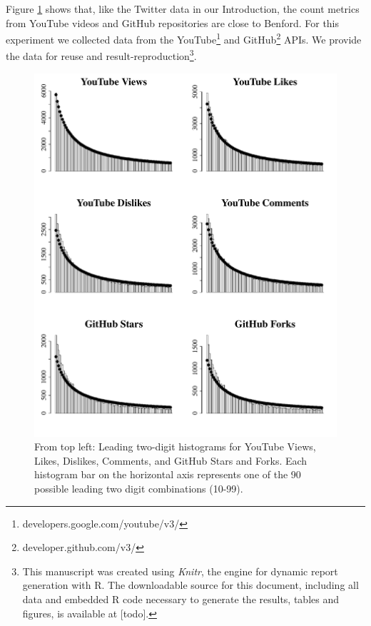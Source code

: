 \documentclass[twoside,leqno,twocolumn]{article}\usepackage[]{graphicx}\usepackage[]{color}
\makeatletter
\def\maxwidth{ %
  \ifdim\Gin@nat@width>\linewidth
    \linewidth
  \else
    \Gin@nat@width
  \fi
}
\newenvironment{knitrout}{}{} %
\makeatother
\begin{document}
Figure \ref{fig:github-data-digit-distributions} shows that, like the Twitter data in our Introduction, the count metrics from YouTube videos and GitHub repositories are close to Benford. For this experiment we collected data from the YouTube\footnote{developers.google.com/youtube/v3/} and GitHub\footnote{developer.github.com/v3/} APIs. We provide the data for reuse and result-reproduction\footnote{\label{supMatFootnote}This manuscript was created using \textit{Knitr}, the engine for dynamic report generation with R. The downloadable source for this document, including all data and embedded R code necessary to generate the results, tables and figures, is available at [todo].}. 

\begin{knitrout}
\color{fgcolor}\begin{figure}[h]
\includegraphics[width=\maxwidth]{figure/github-data-digit-distributions-1} \caption[From top left]{From top left: Leading two-digit histograms for YouTube Views, Likes, Dislikes, Comments, and GitHub Stars and Forks. Each histogram bar on the horizontal axis represents one of the 90 possible leading two digit combinations (10-99).}\label{fig:github-data-digit-distributions}
\end{figure}


\end{knitrout}
\end{document}
